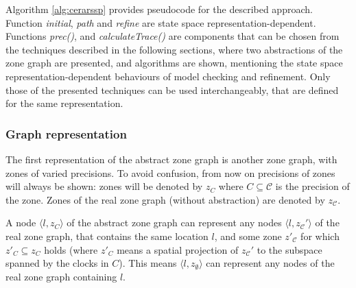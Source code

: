 Algorithm \ref{alg:cerarssp} provides pseudocode for the described approach. Function \emph{initial}, \emph{path} and \emph{refine} are state space representation-dependent. Functions \emph{prec()},  and \emph{calculateTrace()} are components that can be chosen from the techniques described in the following sections, where two abstractions of the zone graph are presented, and algorithms are shown, mentioning the state space representation-dependent behaviours of model checking and refinement. Only those of the presented techniques can be used interchangeably, that are defined for the same representation.





\subsubsection{Graph representation}

The first representation of the abstract zone graph is another zone graph, with zones of varied precisions. To avoid confusion, from now on precisions of zones will always be shown: zones will be denoted by $z_{C}$ where $C \subseteq \mathcal{C}$ is the precision of the zone. Zones of the real zone graph (without abstraction) are denoted by $z_{\mathcal{C}}$.

A node $\langle l, z_{C} \rangle$ of the abstract zone graph can represent any nodes $\langle l, z_{\mathcal{C}}' \rangle$ of the real zone graph, that contains the same location $l$, and some zone $z'_{\mathcal{C}}$ for which $z'_C \subseteq z_C$ holds (where $z'_C$ means a spatial projection of $z_{\mathcal{C}}'$ to the subspace spanned by the clocks in $C$). This means $\langle l, z_{\emptyset} \rangle$ can represent any nodes of the real zone graph containing $l$. 

